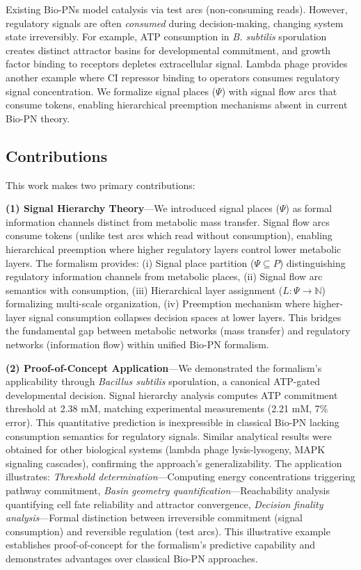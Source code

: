\noindent 
Existing Bio-PNs model catalysis via test arcs (non-consuming reads). However, regulatory signals are often \textit{consumed} during decision-making, changing system state irreversibly. For example, ATP consumption in \textit{B. subtilis} sporulation creates distinct attractor basins for developmental commitment, and growth factor binding to receptors depletes extracellular signal. Lambda phage provides another example where CI repressor binding to operators consumes regulatory signal concentration. We formalize signal places ($\Psi$) with signal flow arcs that consume tokens, enabling hierarchical preemption mechanisms absent in current Bio-PN theory.

\subsection{Contributions}

This work makes two primary contributions:

\noindent\textbf{(1) Signal Hierarchy Theory}---We introduced signal places ($\Psi$) as formal information channels distinct from metabolic mass transfer. Signal flow arcs consume tokens (unlike test arcs which read without consumption), enabling hierarchical preemption where higher regulatory layers control lower metabolic layers. The formalism provides: (i) Signal place partition ($\Psi \subseteq P$) distinguishing regulatory information channels from metabolic places, (ii) Signal flow arc semantics with consumption, (iii) Hierarchical layer assignment ($L: \Psi \to \mathbb{N}$) formalizing multi-scale organization, (iv) Preemption mechanism where higher-layer signal consumption collapses decision spaces at lower layers. This bridges the fundamental gap between metabolic networks (mass transfer) and regulatory networks (information flow) within unified Bio-PN formalism.

\noindent\textbf{(2) Proof-of-Concept Application}---We demonstrated the formalism's applicability through \textit{Bacillus subtilis} sporulation, a canonical ATP-gated developmental decision. Signal hierarchy analysis computes ATP commitment threshold at 2.38 mM, matching experimental measurements (2.21 mM, 7\% error). This quantitative prediction is inexpressible in classical Bio-PN lacking consumption semantics for regulatory signals. Similar analytical results were obtained for other biological systems (lambda phage lysis-lysogeny, MAPK signaling cascades), confirming the approach's generalizability. The application illustrates: \textit{Threshold determination}---Computing energy concentrations triggering pathway commitment, \textit{Basin geometry quantification}---Reachability analysis quantifying cell fate reliability and attractor convergence, \textit{Decision finality analysis}---Formal distinction between irreversible commitment (signal consumption) and reversible regulation (test arcs). This illustrative example establishes proof-of-concept for the formalism's predictive capability and demonstrates advantages over classical Bio-PN approaches.

